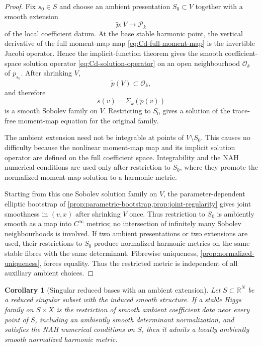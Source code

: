 \documentclass[11pt,reqno]{amsart}
\newtheorem{corollary}[theorem]{Corollary}
\theoremstyle{definition}
\theoremstyle{remark}
\newcommand{\R}{\mathbb R}
\newcommand{\cO}{\mathcal O}
\newcommand{\cP}{\mathcal P}
\begin{document}
\begin{proof}
Fix $s_0\in S$ and choose an ambient presentation $S_0\subset V$ together with a smooth extension
\[
  \widetilde p:V\to\cP_k
\]
of the local coefficient datum.  At the base stable harmonic point, the vertical derivative of the full moment-map map \eqref{eq:Cd-full-moment-map} is the invertible Jacobi operator.  Hence the implicit-function theorem gives the smooth coefficient-space solution operator \eqref{eq:Cd-solution-operator} on an open neighbourhood $\cO_k$ of $p_{s_0}$.  After shrinking $V$,
\[
  \widetilde p(V)\subset\cO_k,
\]
and therefore
\[
  \widetilde s(v)=\Sigma_k(\widetilde p(v))
\]
is a smooth Sobolev family on $V$.  Restricting to $S_0$ gives a solution of the trace-free moment-map equation for the original family.

The ambient extension need not be integrable at points of $V\setminus S_0$.  This causes no difficulty because the nonlinear moment-map map and its implicit solution operator are defined on the full coefficient space.  Integrability and the NAH numerical conditions are used only after restriction to $S_0$, where they promote the normalized moment-map solution to a harmonic metric.

Starting from this one Sobolev solution family on $V$, the parameter-dependent elliptic bootstrap of \cref{prop:parametric-bootstrap,prop:joint-regularity} gives joint smoothness in $(v,x)$ after shrinking $V$ once.  Thus restriction to $S_0$ is ambiently smooth as a map into $C^\infty$ metrics; no intersection of infinitely many Sobolev neighbourhoods is involved.  If two ambient presentations or two extensions are used, their restrictions to $S_0$ produce normalized harmonic metrics on the same stable fibres with the same determinant.  Fibrewise uniqueness, \cref{prop:normalized-uniqueness}, forces equality.  Thus the restricted metric is independent of all auxiliary ambient choices.
\end{proof}

\begin{corollary}[Singular reduced bases with an ambient extension]\label{cor:singular-subset-stable}
Let $S\subset\R^N$ be a reduced singular subset with the induced smooth structure.  If a stable Higgs family on $S\times X$ is the restriction of smooth ambient coefficient data near every point of $S$, including an ambiently smooth determinant normalization, and satisfies the NAH numerical conditions on $S$, then it admits a locally ambiently smooth normalized harmonic metric.
\end{corollary}
\end{document}
